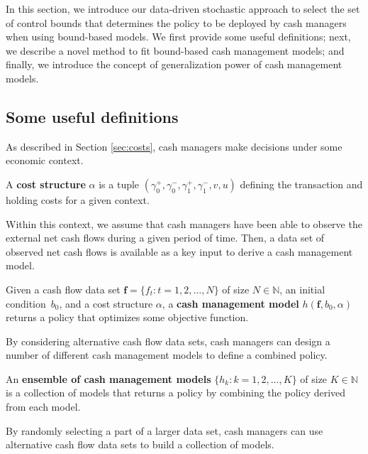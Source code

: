 In this section, we introduce our data-driven stochastic approach to select the set of control bounds that determines the policy to be deployed by cash managers when using bound-based models. We first provide some useful definitions; next, we describe a novel method to fit bound-based cash management models; and finally, we introduce the concept of generalization power of cash management models.

\subsection{Some useful definitions\label{sec:definitions}}

As described in Section \ref{sec:costs}, cash managers make decisions under some economic context. 

\begin{definition}
A \textbf{cost structure} $\alpha$ is a tuple $\left(\gamma_0^+,\gamma_0^-,\gamma_1^+,\gamma_1^-,v,u\right)$ defining the transaction and holding costs for a given context.
\end{definition}

Within this context, we assume that cash managers have been able to observe the external net cash flows during a given period of time. Then, a data set of observed net cash flows is available as a key input to derive a cash management model.


\begin{definition}
Given a cash flow data set $\boldsymbol{f}=\{f_t:t=1,2,\ldots, N\}$ of size $N \in \mathbb{N}$, an initial condition~$b_0$, and a cost structure $\alpha$, a \textbf{cash management model} $h(\boldsymbol{f},b_0,\alpha)$ returns a policy that optimizes some objective function.
\end{definition}

By considering alternative cash flow data sets, cash managers can design a number of different cash management models to define a combined policy.

\begin{definition}
An \textbf{ensemble of cash management models} $\{h_k:k=1,2, \ldots,K\}$ of size $K \in \mathbb{N}$ is a collection of models that returns a policy by combining the policy derived from each model.
\label{def:3}
\end{definition}

By randomly selecting a part of a larger data set, cash managers can use alternative cash flow data sets to build a collection of models.


